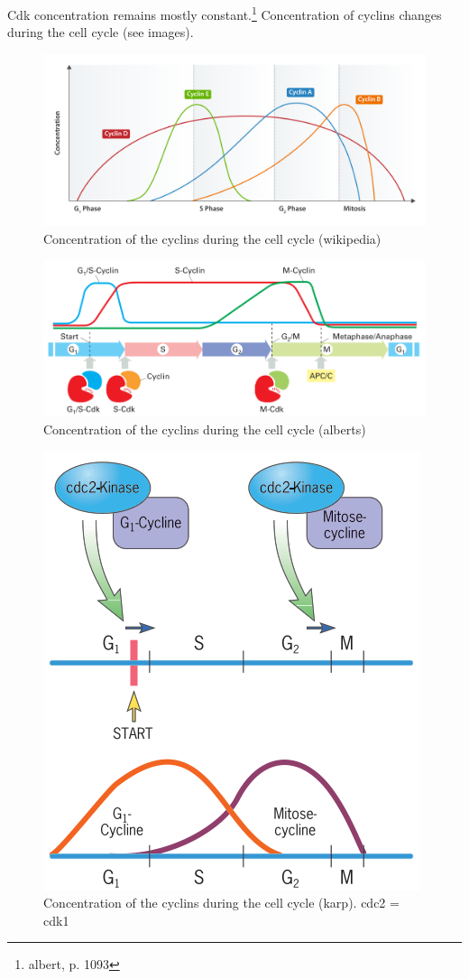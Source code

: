 \documentclass{article}
\begin{document}
	Cdk concentration remains mostly constant.\footnote{albert, p. 1093} Concentration of cyclins changes during the cell cycle (see images).
	
	\begin{figure}[H]
		\centering
		\includegraphics[width=\linewidth]{cyclin_activity_wikipedia.png}
		\caption{Concentration of the cyclins during the cell cycle (wikipedia)}
	\end{figure}
	
	\begin{figure}[H]
		\centering
		\includegraphics[width=\linewidth]{cyclin_activity_alberts.png}
		\caption{Concentration of the cyclins during the cell cycle (alberts)}
	\end{figure}
	
	\begin{figure}[H]
		\centering
		\includegraphics[width=0.8\linewidth]{cyclin_activity_karp.png}
		\caption{Concentration of the cyclins during the cell cycle (karp). cdc2 = cdk1}
	\end{figure}
	
\end{document}
